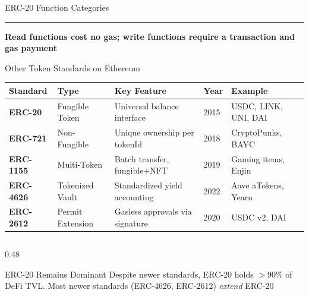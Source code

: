 \documentclass[8pt,aspectratio=169]{beamer}
\newcommand{\bottomnote}[1]{\vfill\vspace{-2mm}\textcolor{mllavender2}{\rule{\textwidth}{0.4pt}}\vspace{1mm}\footnotesize\textbf{#1}}
\begin{document}
\begin{frame}{ERC-20 Function Categories}
\begin{center}
  \end{center}
  \bottomnote{Read functions cost no gas; write functions require a transaction and gas payment}
\end{frame}

\begin{frame}{Other Token Standards on Ethereum}
  \vspace{4pt}
  \begin{center}
  \begin{tabular}{@{}llllp{3.2cm}@{}}
    \toprule
    \rowcolor{mllavender3}
    \textbf{Standard} & \textbf{Type} & \textbf{Key Feature} & \textbf{Year} & \textbf{Example} \\
    \midrule
    \rowcolor{mllavender4}
    \textbf{ERC-20}   & Fungible Token    & Universal balance interface    & 2015 & USDC, LINK, UNI, DAI \\
    \rowcolor{white}
    \textbf{ERC-721}  & Non-Fungible      & Unique ownership per tokenId   & 2018 & CryptoPunks, BAYC \\
    \rowcolor{mllavender4}
    \textbf{ERC-1155} & Multi-Token       & Batch transfer, fungible+NFT   & 2019 & Gaming items, Enjin \\
    \rowcolor{white}
    \textbf{ERC-4626} & Tokenized Vault   & Standardized yield accounting  & 2022 & Aave aTokens, Yearn \\
    \rowcolor{mllavender4}
    \textbf{ERC-2612} & Permit Extension  & Gasless approvals via signature & 2020 & USDC v2, DAI \\
    \bottomrule
  \end{tabular}
  \end{center}
  \vspace{4pt}
  \begin{columns}[T]
    \begin{column}{0.48\textwidth}
      \begin{block}{ERC-20 Remains Dominant}
        \small
        Despite newer standards, ERC-20 holds $>$90\% of DeFi TVL.
        Most newer standards (ERC-4626, ERC-2612) \emph{extend} ERC-20

\end{block}
\end{column}
\end{columns}
\end{frame}
\end{document}
